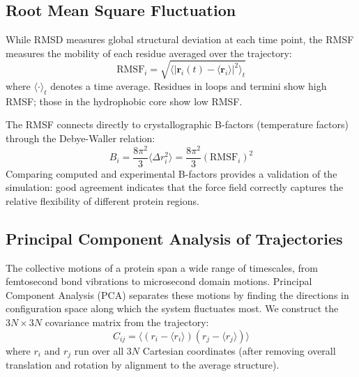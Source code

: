 \subsection{Root Mean Square Fluctuation}
\label{sec:rmsf}

While RMSD measures global structural deviation at each time point, the RMSF measures the mobility of each residue averaged over the trajectory:
\begin{equation}
\label{eq:rmsf}
\text{RMSF}_i = \sqrt{\langle |\mathbf{r}_i(t) - \langle \mathbf{r}_i \rangle|^2 \rangle_t}
\end{equation}
where $\langle \cdot \rangle_t$ denotes a time average. Residues in loops and termini show high RMSF; those in the hydrophobic core show low RMSF.

The RMSF connects directly to crystallographic B-factors (temperature factors) through the Debye-Waller relation:
\begin{equation}
\label{eq:bfactor-rmsf}
B_i = \frac{8\pi^2}{3}\langle \Delta r_i^2 \rangle = \frac{8\pi^2}{3}(\text{RMSF}_i)^2
\end{equation}
Comparing computed and experimental B-factors provides a validation of the simulation: good agreement indicates that the force field correctly captures the relative flexibility of different protein regions.

\subsection{Principal Component Analysis of Trajectories}
\label{sec:pca}

The collective motions of a protein span a wide range of timescales, from femtosecond bond vibrations to microsecond domain motions. Principal Component Analysis (PCA) separates these motions by finding the directions in configuration space along which the system fluctuates most. We construct the $3N \times 3N$ covariance matrix from the trajectory:
\begin{equation}
\label{eq:covariance}
C_{ij} = \langle (r_i - \langle r_i \rangle)(r_j - \langle r_j \rangle) \rangle
\end{equation}
where $r_i$ and $r_j$ run over all $3N$ Cartesian coordinates (after removing overall translation and rotation by alignment to the average structure).

